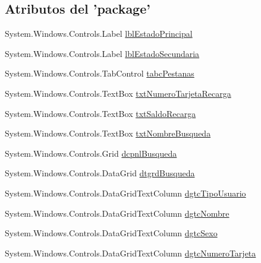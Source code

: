 \subsection*{Atributos del 'package'}
\begin{DoxyCompactItemize}
\item 
System.\-Windows.\-Controls.\-Label \hyperlink{class_proyecto___integrador__3_1_1_main_window_a3120ba863f838314aeed5764404c80d5}{lbl\-Estado\-Principal}
\item 
System.\-Windows.\-Controls.\-Label \hyperlink{class_proyecto___integrador__3_1_1_main_window_ab3c46fae3b8ee53389013b8cc0426f77}{lbl\-Estado\-Secundaria}
\item 
System.\-Windows.\-Controls.\-Tab\-Control \hyperlink{class_proyecto___integrador__3_1_1_main_window_a46bffd3bc6bf702252e6568b9c00f35c}{tabc\-Pestanas}
\item 
System.\-Windows.\-Controls.\-Text\-Box \hyperlink{class_proyecto___integrador__3_1_1_main_window_a921e64f5a9f1531f12802b32f06bf71b}{txt\-Numero\-Tarjeta\-Recarga}
\item 
System.\-Windows.\-Controls.\-Text\-Box \hyperlink{class_proyecto___integrador__3_1_1_main_window_aeb68364159bb1ed1dbf417a205fd3519}{txt\-Saldo\-Recarga}
\item 
System.\-Windows.\-Controls.\-Text\-Box \hyperlink{class_proyecto___integrador__3_1_1_main_window_a8b7a97d30e0788fb2ff72eaee1d0ab88}{txt\-Nombre\-Busqueda}
\item 
System.\-Windows.\-Controls.\-Grid \hyperlink{class_proyecto___integrador__3_1_1_main_window_a41eb8f3098c61c6e0dcf936594c033d4}{dcpnl\-Busqueda}
\item 
System.\-Windows.\-Controls.\-Data\-Grid \hyperlink{class_proyecto___integrador__3_1_1_main_window_aa4ad8e119bd619ccc03b22de048dfe57}{dtgrd\-Busqueda}
\item 
System.\-Windows.\-Controls.\-Data\-Grid\-Text\-Column \hyperlink{class_proyecto___integrador__3_1_1_main_window_a7760fc254a46e1c3b276f91e25f17a6a}{dgtc\-Tipo\-Usuario}
\item 
System.\-Windows.\-Controls.\-Data\-Grid\-Text\-Column \hyperlink{class_proyecto___integrador__3_1_1_main_window_a867d58258d7e2baa1b4d446dda2f2c51}{dgtc\-Nombre}
\item 
System.\-Windows.\-Controls.\-Data\-Grid\-Text\-Column \hyperlink{class_proyecto___integrador__3_1_1_main_window_a62ea2abb05ef20cbb64ebc690ca3011d}{dgtc\-Sexo}
\item 
System.\-Windows.\-Controls.\-Data\-Grid\-Text\-Column \hyperlink{class_proyecto___integrador__3_1_1_main_window_ab28b60d43c765aa3cf2dc7c64e56f8c7}{dgtc\-Numero\-Tarjeta}

\end{DoxyCompactItemize}
